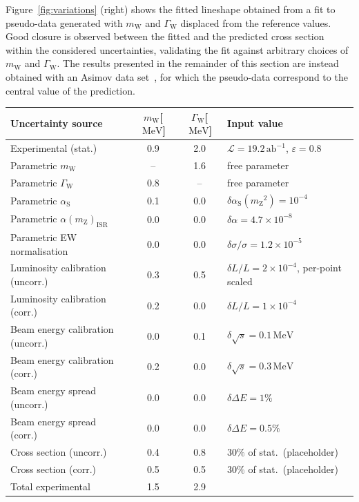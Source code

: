 \documentclass[a4paper,11pt]{article}
\newcommand{\sqrts}{\ensuremath{\sqrt{s}}\xspace}
\newcommand{\mW}{\ensuremath{m_\mathrm{W}}\xspace}
\newcommand{\mZ}{\ensuremath{m_\mathrm{Z}}\xspace}
\newcommand{\GW}{\ensuremath{\Gamma_\mathrm{W}}\xspace}
\newcommand{\as}{\ensuremath{\alpha_\mathrm{S}}\xspace}
\newcommand{\asmz}{\ensuremath{\as(\mZ^2)}\xspace}
\newcommand{\MeV}{\ensuremath{\,\mathrm{MeV}}\xspace}
\newcommand{\abinv}{\ensuremath{\,\mathrm{ab^{-1}}}\xspace}
\begin{document}
Figure~\ref{fig:variations} (right) shows the fitted lineshape obtained
from a fit to pseudo-data generated with \mW and \GW displaced from the
reference values. Good closure is observed between the fitted and the
predicted cross section within the considered uncertainties, validating
the fit against arbitrary choices of \mW and \GW. The results presented
in the remainder of this section are instead obtained with an Asimov
data set~\cite{Cowan:2010js}, for which the pseudo-data correspond to the
central value of the prediction.


\begin{table}[htpb]
    \centering
\begin{tabular}{l|c|c|l}
Uncertainty source  & \mW [\MeV{}] & \GW [\MeV{}] & Input value \\ \hline
Experimental (stat.)              & 0.9 & 2.0 & $\mathcal{L} = 19.2\abinv$, $\varepsilon = 0.8$ \\
Parametric \mW                    & --  & 1.6 & free parameter \\
Parametric \GW                    & 0.8 & --  & free parameter \\
Parametric \as                    & 0.1 & 0.0 & $\delta\asmz = 10^{-4}$ \\
Parametric $\alpha(\mZ)_\mathrm{ISR}$ & 0.0 & 0.0 & $\delta\alpha = 4.7\times10^{-8}$ \\
Parametric EW normalisation       & 0.0 & 0.0 & $\delta\sigma/\sigma = 1.2\times10^{-5}$ \\ \hline
Luminosity calibration (uncorr.)  & 0.3 & 0.5 & $\delta L/L = 2\times10^{-4}$, per-point scaled \\
Luminosity calibration (corr.)    & 0.2 & 0.0 & $\delta L/L = 1\times10^{-4}$ \\
Beam energy calibration (uncorr.) & 0.0 & 0.1 & $\delta\sqrts = 0.1\MeV$ \\
Beam energy calibration (corr.)   & 0.2 & 0.0 & $\delta\sqrts = 0.3\MeV$ \\
Beam energy spread (uncorr.)      & 0.0 & 0.0 & $\delta\Delta E = 1\%$ \\
Beam energy spread (corr.)        & 0.0 & 0.0 & $\delta\Delta E = 0.5\%$ \\
Cross section (uncorr.)           & 0.4 & 0.8 & $30\%$ of stat.\ (placeholder) \\
Cross section (corr.)             & 0.5 & 0.5 & $30\%$ of stat.\ (placeholder) \\
\hline
Total experimental                & 1.5 & 2.9 & \\

\end{tabular}
\end{table}
\end{document}
